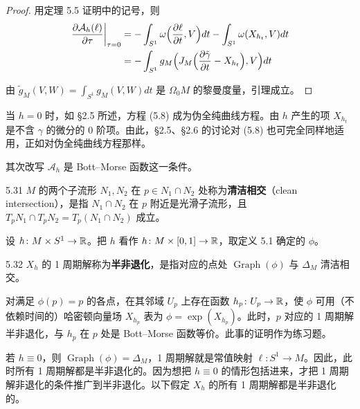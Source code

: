 \begin{proof}
  用定理 5.5 证明中的记号，则
  \begin{align*}
    \left.\frac{\partial\mathcal{A}_h(\ell)}{\partial\tau}\right|_{\tau=0}
    &=-\int_{S^1}\omega\Bigl(\frac{\partial\ell}{\partial t},V\Bigr)dt
      -\int_{S^1}\omega(X_{h_t},V)dt\\
    &=-\int_{S^1}g_M\Bigl(J_M\Bigl(\frac{\partial\tilde\gamma}{\partial t}-X_{h_t}\Bigr),V\Bigr)dt
  \end{align*}

  由 $\tilde g_M(V,W)=\int_{S^1}g_M(V,W)dt$ 是 $\Omega_0M$ 的黎曼度量，引理成立。
\end{proof}


当 $h=0$ 时，如 §2.5 所述，方程 (5.8) 成为伪全纯曲线方程。由 $h$ 产生的项 $X_{h_t}$ 是不含 $\gamma$ 的微分的 0 阶项。由此，§2.5、§2.6 的讨论对 (5.8) 也可完全同样地适用，正如对伪全纯曲线方程那样。

其次改写 $\mathcal{A}_h$ 是 Bott–Morse 函数这一条件。

\begin{definition}{5.31}
  $M$ 的两个子流形 $N_1,N_2$ 在 $p\in N_1\cap N_2$ 处称为\textbf{清洁相交}（clean intersection），是指 $N_1\cap N_2$ 在 $p$ 附近是光滑子流形，且 $T_pN_1\cap T_pN_2=T_p(N_1\cap N_2)$ 成立。
\end{definition}

设 $h\colon M\times S^1\to\mathbb{R}$。把 $h$ 看作 $h\colon M\times[0,1]\to\mathbb{R}$，取定义 5.1 确定的 $\phi$。

\begin{definition}{5.32}
  $X_h$ 的 1 周期解称为\textbf{半非退化}，是指对应的点处 $\operatorname{Graph}(\phi)$ 与 $\Delta_M$ 清洁相交。
\end{definition}

对满足 $\phi(p)=p$ 的各点，在其邻域 $U_p$ 上存在函数 $h_p\colon U_p\to\mathbb{R}$，使 $\phi$ 可用（不依赖时间的）哈密顿向量场 $X_{h_p}$ 表为 $\phi=\exp(X_{h_p})$。此时，$p$ 对应的 1 周期解半非退化，与 $h_p$ 在 $p$ 处是 Bott–Morse 函数等价。此事的证明作为练习题。

若 $h\equiv0$，则 $\operatorname{Graph}(\phi)=\Delta_M$，1 周期解就是常值映射 $\ell\colon S^1\to M$。因此，此时所有 1 周期解都是半非退化的。因为想把 $h\equiv0$ 的情形包括进来，才把 1 周期解非退化的条件推广到半非退化。以下假定 $X_h$ 的所有 1 周期解都是半非退化的。

